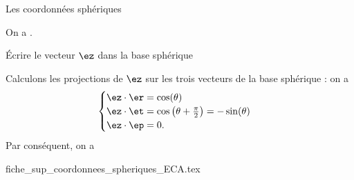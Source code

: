 \begin{exo}[PC][1][appli]{Les coordonnées sphériques}

  	\begin{corrige}
  		On a .
  	\end{corrige}
  	\begin{enonce}
  		Écrire le vecteur $\ez$ dans la base sphérique
  	\end{enonce}


  \begin{corrige}
  Calculons les projections de $\ez$ sur les trois vecteurs de la base sphérique : on a
  $$
  \begin{cases}
  \ez\cdot\er=\cos(\theta) \\
  \ez\cdot\et=\cos\left(\theta+\frac{\pi}{2}\right)=-\sin(\theta)\\%
  \ez\cdot\ep=0.
  \end{cases}
  $$
  Par conséquent, on a
  \end{corrige}
  \initialisationPartieDroite
  \begin{center}
    {fiche_sup_coordonnees_spheriques_ECA.tex}
  \end{center}
  \finalisationDuPartageDePage %
\end{exo}

